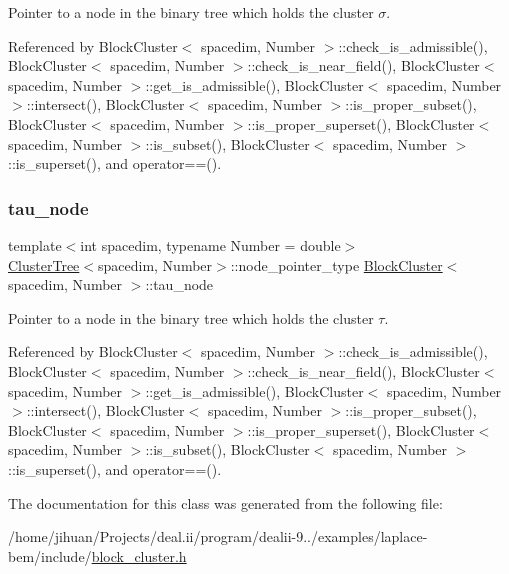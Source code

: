 Pointer to a node in the binary tree which holds the cluster $\sigma$. 

Referenced by Block\+Cluster$<$ spacedim, Number $>$\+::check\+\_\+is\+\_\+admissible(), Block\+Cluster$<$ spacedim, Number $>$\+::check\+\_\+is\+\_\+near\+\_\+field(), Block\+Cluster$<$ spacedim, Number $>$\+::get\+\_\+is\+\_\+admissible(), Block\+Cluster$<$ spacedim, Number $>$\+::intersect(), Block\+Cluster$<$ spacedim, Number $>$\+::is\+\_\+proper\+\_\+subset(), Block\+Cluster$<$ spacedim, Number $>$\+::is\+\_\+proper\+\_\+superset(), Block\+Cluster$<$ spacedim, Number $>$\+::is\+\_\+subset(), Block\+Cluster$<$ spacedim, Number $>$\+::is\+\_\+superset(), and operator==().

\mbox{\label{classBlockCluster_aac88834478cb4e409596e58100a5e9de}} 
\subsubsection{\texorpdfstring{tau\+\_\+node}{tau\_node}}
{\footnotesize\ttfamily template$<$int spacedim, typename Number = double$>$ \\
\hyperlink{classClusterTree}{Cluster\+Tree}$<$spacedim, Number$>$\+::node\+\_\+pointer\+\_\+type \hyperlink{classBlockCluster}{Block\+Cluster}$<$ spacedim, Number $>$\+::tau\+\_\+node\hspace{0.3cm}{\ttfamily [private]}}

Pointer to a node in the binary tree which holds the cluster $\tau$. 

Referenced by Block\+Cluster$<$ spacedim, Number $>$\+::check\+\_\+is\+\_\+admissible(), Block\+Cluster$<$ spacedim, Number $>$\+::check\+\_\+is\+\_\+near\+\_\+field(), Block\+Cluster$<$ spacedim, Number $>$\+::get\+\_\+is\+\_\+admissible(), Block\+Cluster$<$ spacedim, Number $>$\+::intersect(), Block\+Cluster$<$ spacedim, Number $>$\+::is\+\_\+proper\+\_\+subset(), Block\+Cluster$<$ spacedim, Number $>$\+::is\+\_\+proper\+\_\+superset(), Block\+Cluster$<$ spacedim, Number $>$\+::is\+\_\+subset(), Block\+Cluster$<$ spacedim, Number $>$\+::is\+\_\+superset(), and operator==().



The documentation for this class was generated from the following file\+:\begin{DoxyCompactItemize}
\item 
/home/jihuan/\+Projects/deal.\+ii/program/dealii-\/9../examples/laplace-\/bem/include/\hyperlink{block__cluster_8h}{block\+\_\+cluster.\+h}\end{DoxyCompactItemize}
